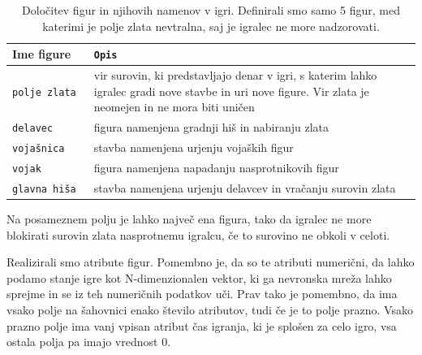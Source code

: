 \documentclass[a4paper, 12pt]{book}
\begin{document}
\begin{table}
	\begin{center}
		\begin{tabular}{p{0.2\linewidth}|p{0.8\linewidth}}
			Ime figure        & {\tt Opis} \\ \hline
			{\tt polje zlata} & vir surovin, ki predstavljajo denar v igri, s katerim lahko igralec gradi nove stavbe in uri nove figure. 
								Vir zlata je neomejen in ne mora biti uničen \\
			{\tt delavec}     & figura namenjena gradnji hiš in nabiranju zlata \\
			{\tt vojašnica}   & stavba namenjena urjenju vojaških figur \\
			{\tt vojak}       & figura namenjena napadanju nasprotnikovih figur \\
			{\tt glavna hiša} & stavba namenjena urjenju delavcev in vračanju surovin zlata \\
		\end{tabular}
	\end{center}
	\caption{Določitev figur in njihovih namenov v igri. Definirali smo samo 5 figur, med katerimi je polje zlata nevtralna, saj je igralec ne more nadzorovati. }
	\label{tableFiguresDescription}
\end{table}

Na posameznem polju je lahko največ ena figura, tako da igralec ne more blokirati surovin zlata nasprotnemu igralcu, če to surovino ne obkoli v celoti.

Realizirali smo atribute figur. 
Pomembno je, da so te atributi numerični, da lahko podamo stanje igre kot N-dimenzionalen vektor, ki ga nevronska mreža lahko sprejme in se iz teh numeričnih podatkov uči.
Prav tako je pomembno, da ima vsako polje na šahovnici enako število atributov, tudi če je to polje prazno.
Vsako prazno polje ima vanj vpisan atribut čas igranja, ki je splošen za celo igro, vsa ostala polja pa imajo vrednost 0.
\end{document}
